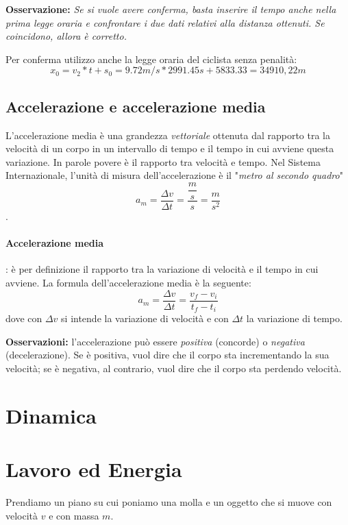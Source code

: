 \documentclass[11pt]{article}
\begin{document}
\textbf{Osservazione:} \textit{Se si vuole avere conferma, basta inserire il tempo anche nella prima legge oraria e confrontare i due dati relativi alla distanza ottenuti. Se coincidono, allora è corretto.} 


Per conferma utilizzo anche la legge oraria del ciclista senza penalità:
\begin{equation*}
 x_0 = v_2 * t + s_0 = 9.72m/s * 2991.45 s + 5833.33 = 34910,22 m
 \end{equation*} 

\subsection{Accelerazione e accelerazione media}
L'accelerazione media è una grandezza \textit{vettoriale} ottenuta dal rapporto tra la velocità di un corpo in un intervallo di tempo e il tempo in cui avviene questa variazione. In parole povere è il rapporto tra velocità e tempo. Nel Sistema Internazionale, l'unità di misura dell'accelerazione è il "\textit{metro al secondo quadro}" $$a_m = \dfrac{\Delta v}{\Delta t} = \dfrac{\dfrac{m}{s}}{s}  = \dfrac{m}{s^2}$$.

\paragraph{Accelerazione media}: è per definizione il rapporto tra la variazione di velocità e il tempo in cui avviene. La formula dell'accelerazione media è la seguente:
\begin{equation}
a_m = \dfrac{\Delta v}{\Delta t} = \dfrac{v_f -v_i}{t_f - t_i}
\end{equation}
dove con $\Delta v$ si intende la variazione di velocità e con $\Delta t$ la variazione di tempo.

\textbf{Osservazioni:} l'accelerazione può essere \textit{positiva} (concorde) o \textit{negativa} (decelerazione). Se è positiva, vuol dire che il corpo sta incrementando la sua velocità; se è negativa, al contrario, vuol dire che il corpo sta perdendo velocità.
\section{Dinamica}
\section{Lavoro ed Energia}


Prendiamo un piano su cui poniamo una molla e un oggetto che si muove con velocità $v$ e con massa $m$.
\end{document}
